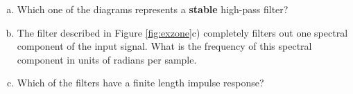 \begin{enumerate}
\begin{enumerate}[a)]
\item Which one of the diagrams represents a \textbf{stable} high-pass filter? 


\item The filter described in Figure \ref{fig:exzone}c) completely filters out one spectral component of the input signal. What is the frequency of this spectral
component in units of radians per sample.

\item Which of the filters have a finite length impulse response? 
\end{enumerate}


\end{enumerate}